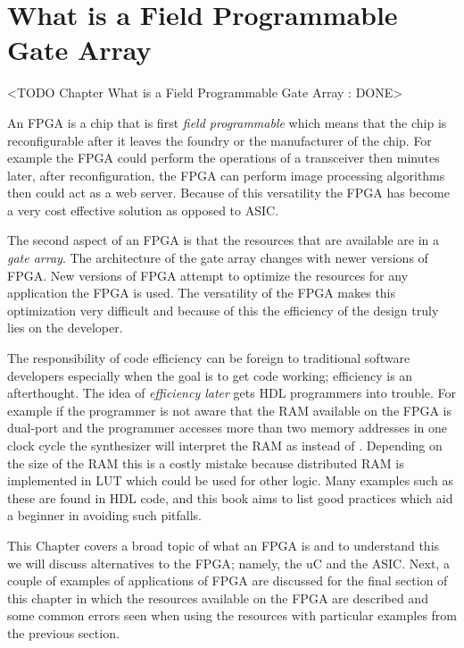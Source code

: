 \chapter{What is a Field Programmable Gate Array}
	<TODO Chapter What is a Field Programmable Gate Array : DONE>

An \ac{FPGA} is a chip that is first \emph{field programmable} which means that the chip is reconfigurable after it leaves the foundry or the manufacturer of the chip. For example the \ac{FPGA} could perform the operations of a transceiver then minutes later, after reconfiguration, the \ac{FPGA} can perform image processing algorithms then could act as a web server. Because of this versatility the \ac{FPGA} has become a very cost effective solution as opposed to \ac{ASIC}.

The second aspect of an \ac{FPGA} is that the resources that are available are in a \emph{gate array}. The architecture of the gate array changes with newer versions of \ac{FPGA}. New versions of \ac{FPGA} attempt to optimize the resources for any application the \ac{FPGA} is used. The versatility of the \ac{FPGA} makes this optimization very difficult and because of this the efficiency of the design truly lies on the developer.

The responsibility of code efficiency can be foreign to traditional software developers especially when the goal is to get code working; efficiency is an afterthought. The idea of \emph{efficiency later} gets \ac{HDL} programmers into trouble. For example if the programmer is not aware that the \ac{RAM} available on the \ac{FPGA} is dual-port and the programmer accesses more than two memory addresses in one clock cycle the synthesizer will interpret the \ac{RAM} as  instead of . Depending on the size of the \ac{RAM} this is a costly mistake because distributed \ac{RAM} is implemented in \ac{LUT} which could be used for other logic. Many examples such as these are found in \ac{HDL} code, and this book aims to list good practices which aid a beginner in avoiding such pitfalls.

This Chapter covers a broad topic of what an \ac{FPGA} is and to understand this we will discuss alternatives to the \ac{FPGA}; namely, the \ac{uC} and the \ac{ASIC}. Next, a couple of examples of applications of \ac{FPGA} are discussed for the final section of this chapter in which the resources available on the \ac{FPGA} are described and some common errors seen when using the resources with particular examples from the previous section. 

